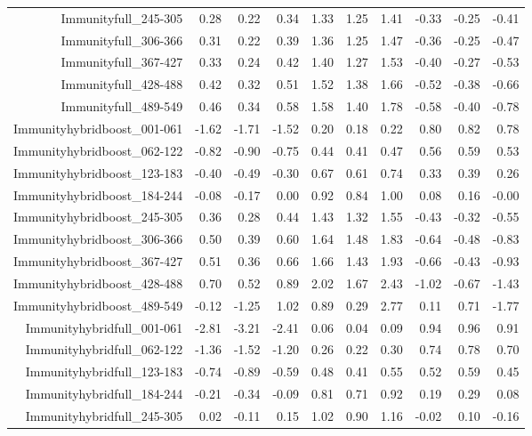 \begin{table}[ht]
\begin{tabular}{rrrrrrrrrr}
  Immunityfull\_245-305 & 0.28 & 0.22 & 0.34 & 1.33 & 1.25 & 1.41 & -0.33 & -0.25 & -0.41 \\ 
  Immunityfull\_306-366 & 0.31 & 0.22 & 0.39 & 1.36 & 1.25 & 1.47 & -0.36 & -0.25 & -0.47 \\ 
  Immunityfull\_367-427 & 0.33 & 0.24 & 0.42 & 1.40 & 1.27 & 1.53 & -0.40 & -0.27 & -0.53 \\ 
  Immunityfull\_428-488 & 0.42 & 0.32 & 0.51 & 1.52 & 1.38 & 1.66 & -0.52 & -0.38 & -0.66 \\ 
  Immunityfull\_489-549 & 0.46 & 0.34 & 0.58 & 1.58 & 1.40 & 1.78 & -0.58 & -0.40 & -0.78 \\ 
  Immunityhybridboost\_001-061 & -1.62 & -1.71 & -1.52 & 0.20 & 0.18 & 0.22 & 0.80 & 0.82 & 0.78 \\ 
  Immunityhybridboost\_062-122 & -0.82 & -0.90 & -0.75 & 0.44 & 0.41 & 0.47 & 0.56 & 0.59 & 0.53 \\ 
  Immunityhybridboost\_123-183 & -0.40 & -0.49 & -0.30 & 0.67 & 0.61 & 0.74 & 0.33 & 0.39 & 0.26 \\ 
  Immunityhybridboost\_184-244 & -0.08 & -0.17 & 0.00 & 0.92 & 0.84 & 1.00 & 0.08 & 0.16 & -0.00 \\ 
  Immunityhybridboost\_245-305 & 0.36 & 0.28 & 0.44 & 1.43 & 1.32 & 1.55 & -0.43 & -0.32 & -0.55 \\ 
  Immunityhybridboost\_306-366 & 0.50 & 0.39 & 0.60 & 1.64 & 1.48 & 1.83 & -0.64 & -0.48 & -0.83 \\ 
  Immunityhybridboost\_367-427 & 0.51 & 0.36 & 0.66 & 1.66 & 1.43 & 1.93 & -0.66 & -0.43 & -0.93 \\ 
  Immunityhybridboost\_428-488 & 0.70 & 0.52 & 0.89 & 2.02 & 1.67 & 2.43 & -1.02 & -0.67 & -1.43 \\ 
  Immunityhybridboost\_489-549 & -0.12 & -1.25 & 1.02 & 0.89 & 0.29 & 2.77 & 0.11 & 0.71 & -1.77 \\ 
  Immunityhybridfull\_001-061 & -2.81 & -3.21 & -2.41 & 0.06 & 0.04 & 0.09 & 0.94 & 0.96 & 0.91 \\ 
  Immunityhybridfull\_062-122 & -1.36 & -1.52 & -1.20 & 0.26 & 0.22 & 0.30 & 0.74 & 0.78 & 0.70 \\ 
  Immunityhybridfull\_123-183 & -0.74 & -0.89 & -0.59 & 0.48 & 0.41 & 0.55 & 0.52 & 0.59 & 0.45 \\ 
  Immunityhybridfull\_184-244 & -0.21 & -0.34 & -0.09 & 0.81 & 0.71 & 0.92 & 0.19 & 0.29 & 0.08 \\ 
  Immunityhybridfull\_245-305 & 0.02 & -0.11 & 0.15 & 1.02 & 0.90 & 1.16 & -0.02 & 0.10 & -0.16 \\ 

\end{tabular}
\end{table}
